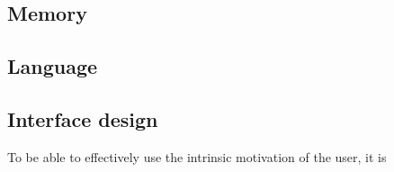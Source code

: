 \subsection{Memory}
\subsection{Language}
\subsection{Interface design}
To be able to effectively use the intrinsic motivation of the user, it is
